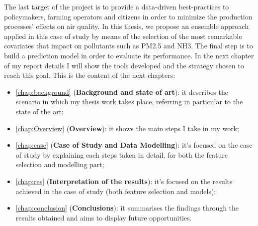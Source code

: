 The last target of the project is to provide a data-driven best-practices to policymakers, farming operators and citizens in order to minimize the production processes' effects on air quality.
\bigskip
In this thesis, we propose an ensemble approach applied in this case of study by means of the selection of the most remarkable covariates that impact on pollutants such as PM2.5 and NH3. 
The final step is to build a prediction model in order to evaluate its performance.  
In the next chapter of my report details I will show the tools developed and the strategy chosen to reach this goal. 
This is the content of the next chapters:

\begin{itemize}
  \item \autoref{chap:background} (\textbf{Background and state of art}): it describes the scenario in which my thesis work takes place, referring in particular to the state of the art;
  \item \autoref{chap:Overview} (\textbf{Overview}): it shows the main steps I take in my work;
  \item \autoref{chap:case} (\textbf{Case of Study and Data Modelling}): it's focused on the case of study by explaining each steps taken in detail, for both the feature selection and modelling part;
 \item \autoref{chap:res} (\textbf{Interpretation of the results}): it's focused on the results achieved in the case of study (both feature selection and models);
 \item \autoref{chap:conclusion} (\textbf{Conclusions}): it summarises the findings through the results obtained and aims to display future opportunities.  
\end{itemize}


